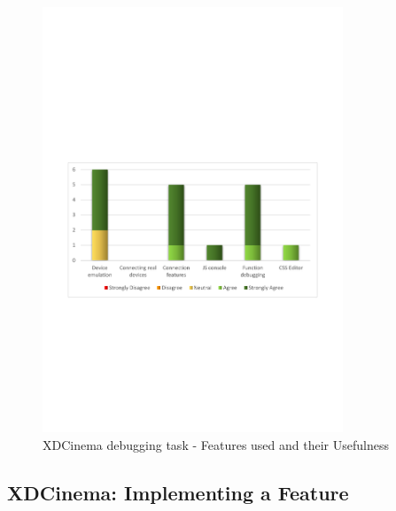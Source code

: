 \begin{figure}[H]
  \centering
    \includegraphics[width=0.8\textwidth]{images/charts/xdc_bug_features_used.pdf}
	\caption[xdc-bug: Features used]{XDCinema debugging task - Features used and their Usefulness}
	\label{fig:xdc_bug_features_used}
\end{figure}

\subsection{XDCinema: Implementing a Feature}

